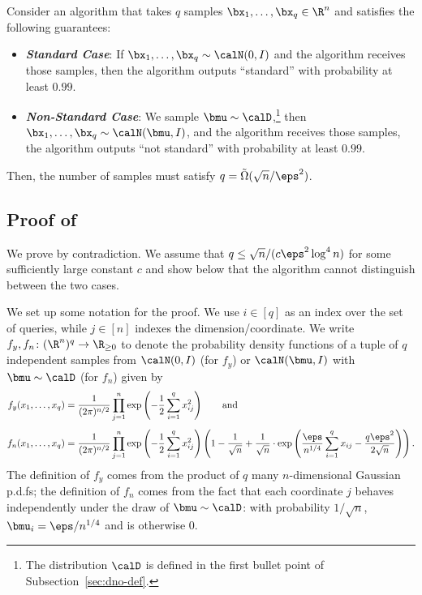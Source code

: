 \begin{lemma}\label{lem:mainlemma1}
Consider an algorithm that takes $q$ samples $\bx_1, \ldots, \bx_q\in \R^n$ and satisfies the following guarantees:
\begin{flushleft}\begin{itemize}
\item \textbf{\emph{Standard Case}}: If $\bx_1,\dots, \bx_q \sim \calN(0, I)$ and the algorithm receives those samples, then the algorithm outputs ``standard'' with probability at least $0.99$.
\item \textbf{\emph{Non-Standard Case}}: We sample $\bmu \sim \calD$,\footnote{The distribution $\calD$ is defined in the first bullet point of Subsection~\ref{sec:dno-def}.} then $\bx_1,\dots, \bx_q \sim \calN(\bmu, I)$, and the algorithm receives those samples, the algorithm outputs ``not standard'' with probability at least $0.99$.
\end{itemize}\end{flushleft}
Then, the number of samples must satisfy $q = \tilde{\Omega}(\sqrt{n}/\eps^2)$.
\end{lemma}

\subsection{Proof of } \label{sec:proof-mono-lb}

We prove by contradiction. {We assume that $q\le  \sqrt{n}/(c\eps^2 \log^4n)$ for some sufficiently large constant $c$} and show below
that the algorithm cannot distinguish between the two cases.

We set up some notation for the proof. We use $i \in [q]$ as an index over the set of queries,
while $j \in [n]$ indexes the dimension/coordinate.
We write $f_y, f_n \colon (\R^n)^q \to \R_{\geq 0}$ to denote the probability density functions of a tuple of $q$ independent samples from $\calN(0, I)$ (for $f_y$) or $\calN(\bmu, I)$ with $\bmu \sim \calD$ (for $f_n$) given by
\begin{align*}
f_y(x_1, \dots, x_q) &= \frac{1}{(2\pi)^{n/2}} \prod_{j=1}^n  \exp\left(-\frac{1}{2} \sum_{i=1}^q x_{ij}^2 \right) \qquad \text{and}\quad \\[1ex]
f_{n}(x_1,\dots, x_q) &= \frac{1}{(2\pi)^{n/2}} \prod_{j=1}^n \exp\left(-\frac{1}{2} \sum_{i=1}^q x_{ij}^2 \right) \left(1 - \frac{1}{\sqrt{n}} + \frac{1}{\sqrt{n}} \cdot \exp\left( \frac{\eps}{n^{1/4}}\sum_{i=1}^q x_{ij} -  \frac{q\eps^2}{2\sqrt{n}} \right)\right).
\end{align*}
The definition of $f_y$ comes from the product of $q$ many $n$-dimensional Gaussian p.d.fs; the definition of $f_n$ comes from the fact that each coordinate $j$ behaves independently under the draw of $\bmu \sim \calD$: with probability $1/\sqrt{n}$, $\bmu_i = \eps / n^{1/4}$ and is otherwise 0.

